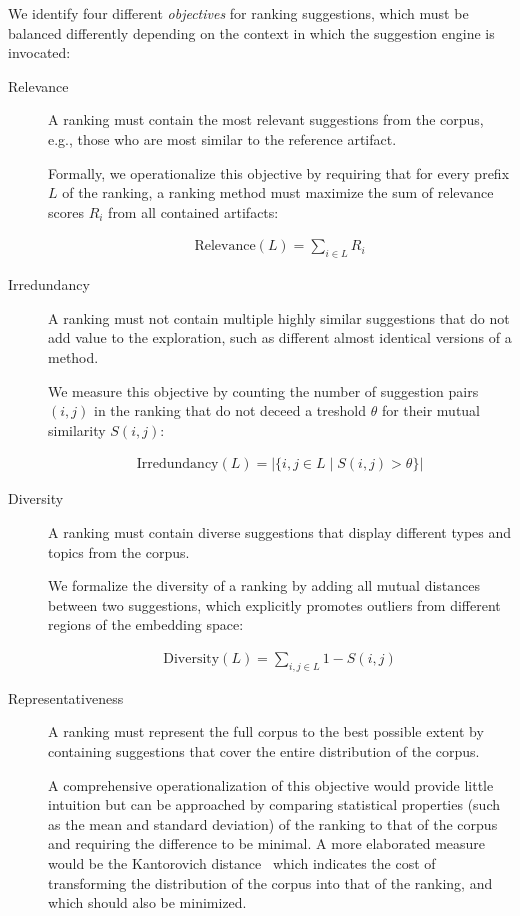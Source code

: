 We identify four different \emph{objectives} for ranking suggestions, which must be balanced differently depending on the context in which the suggestion engine is invocated:

\begin{description}
	\item[Relevance]
	A ranking must contain the most relevant suggestions from the corpus, e.g., those who are most similar to the reference artifact.

	Formally, we operationalize this objective by requiring that for every prefix $L$ of the ranking, a ranking method must maximize the sum of relevance scores $R_i$ from all contained artifacts:

	\begin{align}
		\text{Relevance}(L) = \sum_{i \in L} R_i
	\end{align}

	\item[Irredundancy]
	A ranking must not contain multiple highly similar suggestions that do not add value to the exploration, such as different almost identical versions of a method.

	We measure this objective by counting the number of suggestion pairs $(i, j)$ in the ranking that do not deceed a treshold $\theta$ for their mutual similarity $S(i, j)$:

	\begin{align}
		\text{Irredundancy}(L) = | \{ i, j \in L \mid S(i, j) > \theta \} |
	\end{align}

	\item[Diversity]
	A ranking must contain diverse suggestions that display different types and topics from the corpus.

	We formalize the diversity of a ranking by adding all mutual distances between two suggestions, which explicitly promotes outliers from different regions of the embedding space:

	\begin{align}
		\text{Diversity}(L) = \sum_{i, j \in L} 1 - S(i, j)
	\end{align}

	\item[Representativeness]
	A ranking must represent the full corpus to the best possible extent by containing suggestions that cover the entire distribution of the corpus.

	A comprehensive operationalization of this objective would provide little intuition but can be approached by comparing statistical properties (such as the mean and standard deviation) of the ranking to that of the corpus and requiring the difference to be minimal.
	A more elaborated measure would be the Kantorovich distance~\cite{vaserstein1969markov} which indicates the cost of transforming the distribution of the corpus into that of the ranking, and which should also be minimized.
\end{description}

